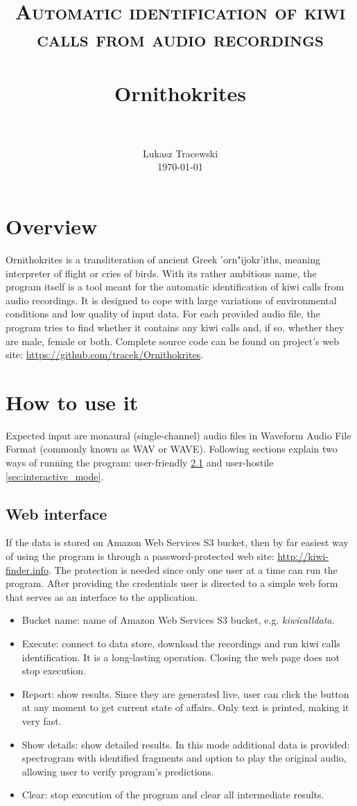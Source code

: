 \documentclass[paper=a4, fontsize=11pt]{scrartcl}	%
\title{
		\usefont{OT1}{bch}{b}{n}
		\normalfont \normalsize \textsc{Automatic identification of kiwi calls from audio recordings} \\ [25pt]
		\horrule{0.5pt} \\[0.4cm]
		\huge Ornithokrites \\
		\horrule{2pt} \\[0.5cm]
}
\author{
		\normalfont 								\normalsize
        Lukasz Tracewski\\[-3pt]		\normalsize
        \today
}
\date{}
\numberwithin{equation}{section}		%
\numberwithin{figure}{section}			%
\numberwithin{table}{section}				%
\begin{document}
\maketitle
\section{Overview}
Ornithokrites is a transliteration of ancient Greek {'orn"ijokr'iths}, meaning interpreter of flight or cries of birds. With its rather ambitious name, the program itself is a tool meant for the automatic identification of kiwi calls from audio recordings. It is designed to cope with large variations of environmental conditions and low quality of input data. For each provided audio file, the program tries to find whether it contains any kiwi calls and, if so, whether they are male, female or both. \newline
Complete source code can be found on project's web site: \url{https://github.com/tracek/Ornithokrites}.

\section{How to use it}
Expected input are monaural (single-channel) audio files in Waveform Audio File Format (commonly known as WAV or WAVE). Following sections explain two ways of running the program: user-friendly \ref{sec:web_interface} and user-hostile \ref{sec:interactive_mode}.
\subsection{Web interface}
\label{sec:web_interface}
If the data is stored on Amazon Web Services S3 bucket, then by far easiest way of using the program is through a password-protected web site: \url{http://kiwi-finder.info}. The protection is needed since only one user at a time can run the program. \newline
After providing the credentials user is directed to a simple web form that serves as an interface to the application. 
\begin{itemize}
	\item Bucket name: name of Amazon Web Services S3 bucket, e.g. \textit{kiwicalldata}.
	\item Execute: connect to data store, download the recordings and run kiwi calls identification. It is a long-lasting operation. Closing the web page does not stop execution.
	\item Report: show results. Since they are generated live, user can click the button at any moment to get current state of affairs. Only text is printed, making it very fast.
	\item Show details: show detailed results. In this mode additional data is provided: spectrogram with identified fragments and option to play the original audio, allowing user to verify program's predictions.
	\item Clear: stop execution of the program and clear all intermediate results.
\end{itemize}
\end{document}
